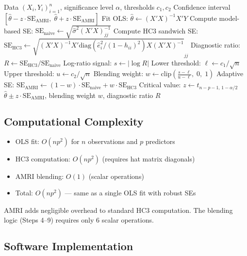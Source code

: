\documentclass[12pt]{article}
\theoremstyle{definition}
\theoremstyle{remark}
\begin{document}
\begin{algorithm}[h]
\caption{AMRI v2: Adaptive Misspecification-Robust Confidence Interval}
\label{alg:amri_v2_full}
\begin{algorithmic}[1]
\Require Data $(X_i, Y_i)_{i=1}^n$, significance level $\alpha$, thresholds $c_1, c_2$
\Ensure Confidence interval $[\hat\theta - z \cdot \text{SE}_\text{AMRI},\; \hat\theta + z \cdot \text{SE}_\text{AMRI}]$
\State Fit OLS: $\hat\theta \gets (X'X)^{-1}X'Y$
\State Compute model-based SE: $\text{SE}_\text{naive} \gets \sqrt{\hat\sigma^2 (X'X)^{-1}_{jj}}$
\State Compute HC3 sandwich SE: $\text{SE}_\text{HC3} \gets \sqrt{(X'X)^{-1} X' \text{diag}(\hat e_i^2/(1-h_{ii})^2) X (X'X)^{-1}}_{jj}$
\State Diagnostic ratio: $R \gets \text{SE}_\text{HC3} / \text{SE}_\text{naive}$
\State Log-ratio signal: $s \gets |\log R|$
\State Lower threshold: $\ell \gets c_1 / \sqrt{n}$
\State Upper threshold: $u \gets c_2 / \sqrt{n}$
\State Blending weight: $w \gets \text{clip}\left(\frac{s - \ell}{u - \ell},\; 0,\; 1\right)$
\State Adaptive SE: $\text{SE}_\text{AMRI} \gets (1 - w) \cdot \text{SE}_\text{naive} + w \cdot \text{SE}_\text{HC3}$
\State Critical value: $z \gets t_{n-p-1,\, 1-\alpha/2}$
\State \Return $\hat\theta \pm z \cdot \text{SE}_\text{AMRI}$, blending weight $w$, diagnostic ratio $R$
\end{algorithmic}
\end{algorithm}

\subsection{Computational Complexity}

\begin{itemize}
\item OLS fit: $O(np^2)$ for $n$ observations and $p$ predictors
\item HC3 computation: $O(np^2)$ (requires hat matrix diagonals)
\item AMRI blending: $O(1)$ (scalar operations)
\item Total: $O(np^2)$ --- same as a single OLS fit with robust SEs
\end{itemize}

AMRI adds negligible overhead to standard HC3 computation. The blending
logic (Steps 4--9) requires only 6 scalar operations.

\subsection{Software Implementation}
\end{document}
